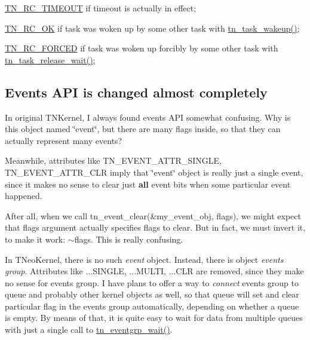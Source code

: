 \begin{DoxyItemize}
\item {\ttfamily \hyperlink{tn__common_8h_aa43bd3da1ad4c1e61224b5f23b369876a5b4d73fde6b5d1c9579c02e6aafce1fb}{T\+N\+\_\+\+R\+C\+\_\+\+T\+I\+M\+E\+O\+U\+T}} if timeout is actually in effect;
\item {\ttfamily \hyperlink{tn__common_8h_aa43bd3da1ad4c1e61224b5f23b369876afb291924237186f5765865256c75e639}{T\+N\+\_\+\+R\+C\+\_\+\+O\+K}} if task was woken up by some other task with {\ttfamily \hyperlink{tn__tasks_8h_abb88bc8b1cec6b82e7b6e2e90d0e155a}{tn\+\_\+task\+\_\+wakeup()}};
\item {\ttfamily \hyperlink{tn__common_8h_aa43bd3da1ad4c1e61224b5f23b369876ae5cbacb0fb01805c9003046c08bf4356}{T\+N\+\_\+\+R\+C\+\_\+\+F\+O\+R\+C\+E\+D}} if task was woken up forcibly by some other task with {\ttfamily \hyperlink{tn__tasks_8h_ae90ecdbd7d87d050c2c98ec775e6efc7}{tn\+\_\+task\+\_\+release\+\_\+wait()}};
\end{DoxyItemize}\hypertarget{tnkernel_diff_tnkernel_diff_event}{}\subsection{Events A\+P\+I is changed almost completely}\label{tnkernel_diff_tnkernel_diff_event}
In original T\+N\+Kernel, I always found events A\+P\+I somewhat confusing. Why is this object named \char`\"{}event\char`\"{}, but there are many flags inside, so that they can actually represent many events?

Meanwhile, attributes like {\ttfamily T\+N\+\_\+\+E\+V\+E\+N\+T\+\_\+\+A\+T\+T\+R\+\_\+\+S\+I\+N\+G\+L\+E}, {\ttfamily T\+N\+\_\+\+E\+V\+E\+N\+T\+\_\+\+A\+T\+T\+R\+\_\+\+C\+L\+R} imply that \char`\"{}event\char`\"{} object is really just a single event, since it makes no sense to clear just {\bfseries all} event bits when some particular event happened.

After all, when we call {\ttfamily tn\+\_\+event\+\_\+clear(\&my\+\_\+event\+\_\+obj, flags)}, we might expect that {\ttfamily flags} argument actually specifies flags to clear. But in fact, we must invert it, to make it work\+: {\ttfamily $\sim$flags}. This is really confusing.

In T\+Neo\+Kernel, there is no such {\itshape event} object. Instead, there is object {\itshape events group}. Attributes like {\ttfamily ...S\+I\+N\+G\+L\+E}, {\ttfamily ...M\+U\+L\+T\+I}, {\ttfamily ...C\+L\+R} are removed, since they make no sense for events group. I have plans to offer a way to {\itshape connect} events group to queue and probably other kernel objects as well, so that queue will set and clear particular flag in the events group automatically, depending on whether a queue is empty. By means of that, it is quite easy to wait for data from multiple queues with just a single call to {\ttfamily \hyperlink{tn__eventgrp_8h_aee53d0c38f050ee6eecbdce19548b157}{tn\+\_\+eventgrp\+\_\+wait()}}.

